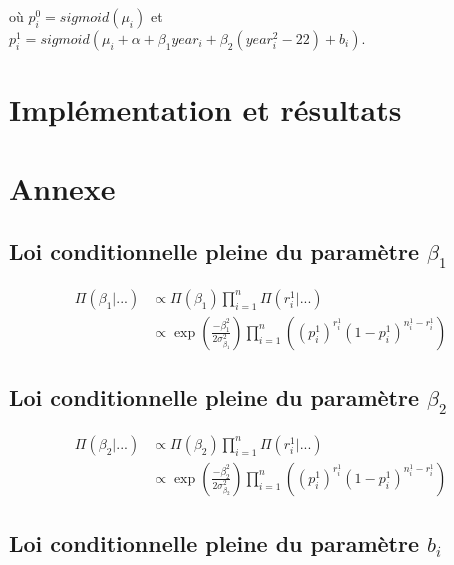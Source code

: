 \documentclass[
]{article}
\begin{document}
où \(p_i^0=sigmoid(\mu_i)\) et
\(p_i^1=sigmoid(\mu_i+\alpha+\beta_1 year_i+\beta_2(year_i^2-22)+b_i)\).

\hypertarget{impluxe9mentation-et-ruxe9sultats}{%
\section{Implémentation et
résultats}\label{impluxe9mentation-et-ruxe9sultats}}

\hypertarget{annexe}{%
\section{Annexe}\label{annexe}}

\hypertarget{loi-conditionnelle-pleine-du-paramuxe8tre-beta_1}{%
\subsection{\texorpdfstring{Loi conditionnelle pleine du paramètre
\(\beta_1\)}{Loi conditionnelle pleine du paramètre \textbackslash beta\_1}}\label{loi-conditionnelle-pleine-du-paramuxe8tre-beta_1}}

\begin{align*}
\Pi(\beta_1|...) &\propto \Pi(\beta_1) \prod_{i=1}^n\Pi(r_i^1|...) \\
&\propto \exp\left({\frac{-\beta_1^2}{2\sigma_{\beta_1}^2}}\right)\prod_{i=1}^n \left((p_i^1)^{r_i^1}(1-p_i^1)^{n_i^1-r_i^1}\right)
\end{align*}

\hypertarget{loi-conditionnelle-pleine-du-paramuxe8tre-beta_2}{%
\subsection{\texorpdfstring{Loi conditionnelle pleine du paramètre
\(\beta_2\)}{Loi conditionnelle pleine du paramètre \textbackslash beta\_2}}\label{loi-conditionnelle-pleine-du-paramuxe8tre-beta_2}}

\begin{align*}
\Pi(\beta_2|...) &\propto \Pi(\beta_2) \prod_{i=1}^n\Pi(r_i^1|...) \\
&\propto \exp\left({\frac{-\beta_2^2}{2\sigma_{\beta_2}^2}}\right)\prod_{i=1}^n \left((p_i^1)^{r_i^1}(1-p_i^1)^{n_i^1-r_i^1}\right)
\end{align*}

\hypertarget{loi-conditionnelle-pleine-du-paramuxe8tre-b_i}{%
\subsection{\texorpdfstring{Loi conditionnelle pleine du paramètre
\(b_i\)}{Loi conditionnelle pleine du paramètre b\_i}}\label{loi-conditionnelle-pleine-du-paramuxe8tre-b_i}}
\end{document}
